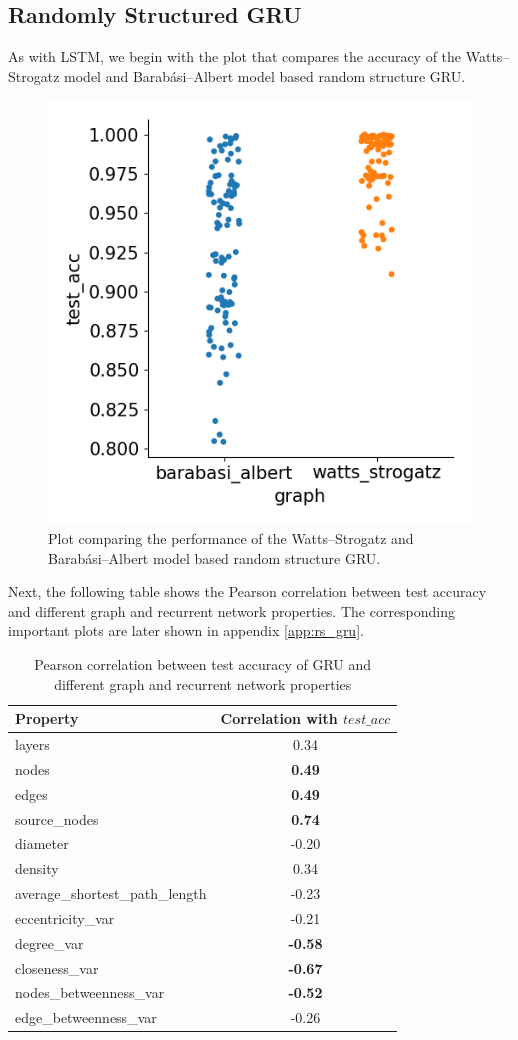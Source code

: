 \subsection{Randomly Structured GRU}

As with LSTM, we begin with the plot that compares the accuracy of the Watts–Strogatz model and Barabási–Albert model based random structure GRU.

\begin{figure}[H]
	\centering
	\includegraphics[width=0.45\linewidth]{images/results/random/gru/graph_test_acc.png}
	\caption[Performance of the WS and BA based random structure GRU]%
	{Plot comparing the performance of the Watts–Strogatz and Barabási–Albert model based random structure GRU.}
	\label{fig:gru_acc_comp}
\end{figure}

Next, the following table shows the Pearson correlation between test accuracy and different graph and recurrent network properties. The corresponding important plots are later shown in appendix \ref{app:rs_gru}.

\begin{table}[h]
	\centering
	\begin{tabular}{|l|c|}
	    \hline
		\textbf{Property} & \textbf{Correlation with $test\_acc$}\\
		\hline
		layers & 0.34\\
		nodes & \textbf{0.49}\\
		edges & \textbf{0.49}\\
		source\_nodes & \textbf{0.74}\\
		diameter & -0.20\\
		density & 0.34\\
		average\_shortest\_path\_length & -0.23\\
		eccentricity\_var & -0.21\\
		degree\_var & \textbf{-0.58}\\
		closeness\_var & \textbf{-0.67}\\
		nodes\_betweenness\_var & \textbf{-0.52}\\
		edge\_betweenness\_var & -0.26\\
		\hline
	\end{tabular}
	\caption[Pearson correlation between test accuracy of GRU and different graph and recurrent network properties]{Pearson correlation between test accuracy of GRU and different graph and recurrent network properties}
	\label{tab:gru_corr}
\end{table}

